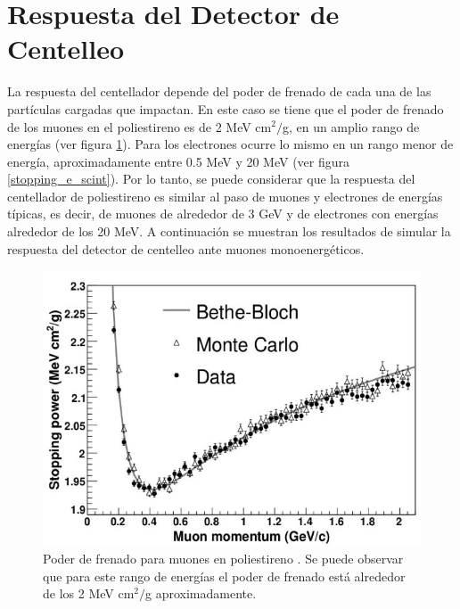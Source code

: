 \documentclass[12pt,oneside,openany,letter]{book}
\begin{document}

\section{Respuesta del Detector de 
Centelleo}
La respuesta del centellador depende del poder de frenado de cada una de las partículas cargadas que impactan. En este caso se tiene que el poder de frenado de los muones en el poliestireno es de 2 MeV cm$^2/$g, en un amplio rango de energías (ver figura \ref{stopping_mu_scint}). Para los electrones ocurre lo mismo en un rango menor de energía, aproximadamente entre 0.5 MeV y 20 MeV (ver figura \ref{stopping_e_scint}). Por lo tanto, se puede considerar que la respuesta del centellador de poliestireno es similar al paso de muones y electrones de energ\'ias t\'ipicas, es decir, de muones de alrededor de 3 GeV y de electrones con energ\'ias alrededor de los 20 MeV. A continuaci\'on se muestran los resultados de simular la respuesta del detector de centelleo ante muones monoenerg\'eticos.  
\begin{figure}[h!]
    \centering        \includegraphics[scale=0.6]{images/stopping_mu_scint.png}
\caption[Poder de frenado para muones en poliestireno]{Poder de frenado para muones en poliestireno \cite{Gonzalez-maestrando2012}. Se puede observar que para este rango de energ\'ias el poder de frenado est\'a alrededor de los 2 MeV cm$^2/$g aproximadamente.}\label{stopping_mu_scint}
\end{figure}
\end{document}

